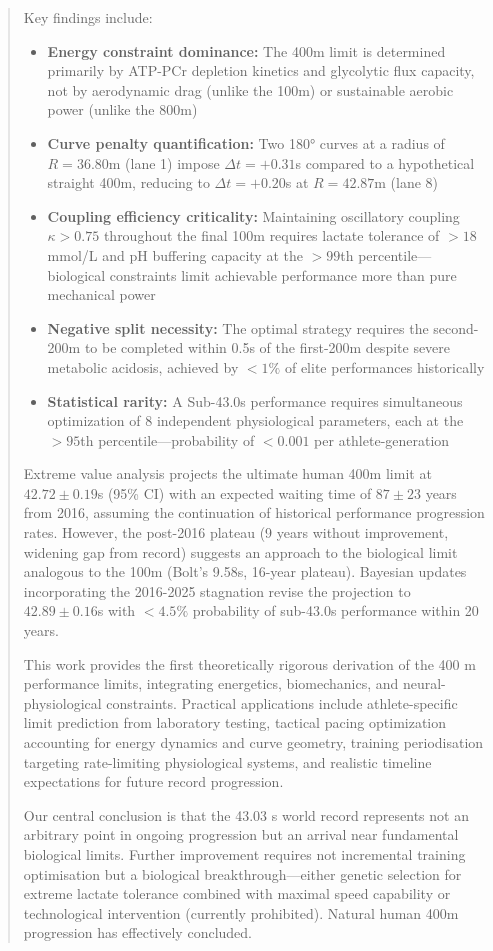 \documentclass[12pt,a4paper]{article}
\begin{document}
\begin{abstract}
Key findings include:
\begin{itemize}
    \item \textbf{Energy constraint dominance:} The 400m limit is determined primarily by ATP-PCr depletion kinetics and glycolytic flux capacity, not by aerodynamic drag (unlike the 100m) or sustainable aerobic power (unlike the 800m)
    \item \textbf{Curve penalty quantification:} Two 180° curves at a radius of $R = 36.80$m (lane 1) impose $\Delta t = +0.31$s compared to a hypothetical straight 400m, reducing to $\Delta t = +0.20$s at $R = 42.87$m (lane 8)
    \item \textbf{Coupling efficiency criticality:} Maintaining oscillatory coupling $\kappa > 0.75$ throughout the final 100m requires lactate tolerance of $>18$ mmol/L and pH buffering capacity at the $>99$th percentile—biological constraints limit achievable performance more than pure mechanical power
    \item \textbf{Negative split necessity:} The optimal strategy requires the second-200m to be completed within 0.5s of the first-200m despite severe metabolic acidosis, achieved by $<1\%$ of elite performances historically
    \item \textbf{Statistical rarity:} A Sub-43.0s performance requires simultaneous optimization of 8 independent physiological parameters, each at the $>95$th percentile—probability of $<0.001$ per athlete-generation
\end{itemize}

Extreme value analysis projects the ultimate human 400m limit at $42.72 \pm 0.19$s (95\% CI) with an expected waiting time of $87 \pm 23$ years from 2016, assuming the continuation of historical performance progression rates. However, the post-2016 plateau (9 years without improvement, widening gap from record) suggests an approach to the biological limit analogous to the 100m (Bolt's 9.58s, 16-year plateau). Bayesian updates incorporating the 2016-2025 stagnation revise the projection to $42.89 \pm 0.16$s with $<4.5\%$ probability of sub-43.0s performance within 20 years.

This work provides the first theoretically rigorous derivation of the 400 m performance limits, integrating energetics, biomechanics, and neural-physiological constraints. Practical applications include athlete-specific limit prediction from laboratory testing, tactical pacing optimization accounting for energy dynamics and curve geometry, training periodisation targeting rate-limiting physiological systems, and realistic timeline expectations for future record progression.

Our central conclusion is that the 43.03 s world record represents not an arbitrary point in ongoing progression but an arrival near fundamental biological limits. Further improvement requires not incremental training optimisation but a biological breakthrough—either genetic selection for extreme lactate tolerance combined with maximal speed capability or technological intervention (currently prohibited). Natural human 400m progression has effectively concluded.
\end{abstract}
\end{document}
